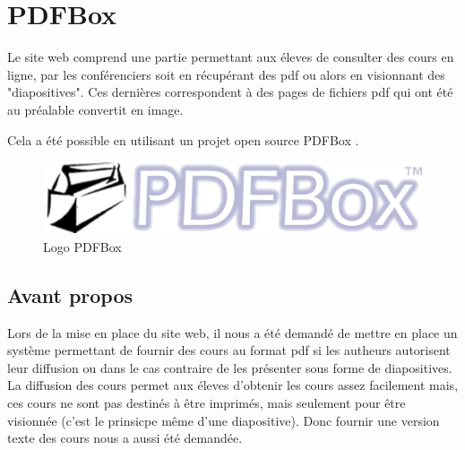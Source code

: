 \chapter{PDFBox}
    Le site web comprend une partie permettant aux éleves de consulter des cours 
en ligne, par les conférenciers soit en récupérant des pdf ou alors en visionnant
des "diapositives". Ces dernières correspondent à des pages de fichiers pdf qui
ont été au préalable convertit en image. 

    Cela a été possible en utilisant un projet open source PDFBox \cite{pdfbox}.
\newline
\newline

    \begin{figure}[h]
        \begin{center}
            \includegraphics[scale=0.6]{PDFBox.png} 
        \end{center}

        \caption{Logo PDFBox}
        \label{Logo PDFBox}
    \end{figure}

\newpage


    \section{Avant propos}
    Lors de la mise en place du site web, il nous a été demandé de mettre en place un 
    système permettant de fournir des cours au format pdf si les autheurs autorisent
    leur diffusion ou dans le cas contraire de les présenter sous forme de diapositives.
    La diffusion des cours permet  aux éleves d'obtenir les cours assez facilement mais,
    ces cours ne sont pas destinés à être imprimés, mais seulement pour être visionnée
    (c'est le prinsicpe même d'une diapositive). Donc fournir une version texte des cours
    nous a aussi été demandée.
    
